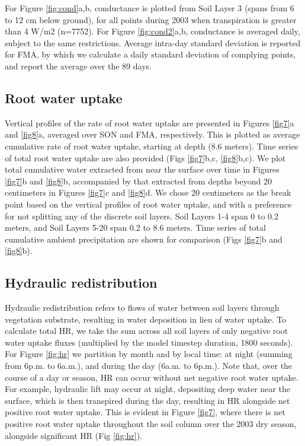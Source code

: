 \documentclass[draft,linenumbers]{agujournal}
\begin{document}
    For Figure \ref{fig:cond}a,b, conductance is plotted from Soil Layer 3 (spans from 6 to 12 cm below ground),
     for all points during 2003 when transpiration is greater than 4 W/m2 (n=7752).
    For Figure \ref{fig:cond2}a,b, conductance is averaged daily, subject to the same restrictions.
    Average intra-day standard deviation is reported for FMA, by which we calculate a daily standard deviation of complying points, and report the average over the 89 days.


\subsection{Root water uptake}
    Vertical profiles of the rate of root water uptake are presented in Figures \ref{fig7}a and \ref{fig8}a, averaged over SON and FMA, respectively.
    This is plotted as average cumulative rate of root water uptake, starting at depth (8.6 meters).
    Time series of total root water uptake are also provided (Figs \ref{fig7}b,c, \ref{fig8}b,c).
    We plot total cumulative water extracted from near the surface over time in Figures \ref{fig7}b and \ref{fig8}b, 
    accompanied by that extracted from depths beyond 20 centimeters in Figures \ref{fig7}c and \ref{fig8}d.
    We chose 20 centimeters as the break point based on the vertical profiles of root water uptake, and with a preference for not splitting any of the discrete soil layers.
    Soil Layers 1-4 span 0 to 0.2 meters, and Soil Layers 5-20 span 0.2 to 8.6 meters.
    Time series of total cumulative ambient precipitation are shown for comparison (Figs \ref{fig7}b and \ref{fig8}b).
    
        
\subsection{Hydraulic redistribution}
    Hydraulic redistribution refers to flows of water between soil layers through vegetation substrate, resulting in water deposition in lieu of water uptake.
    To calculate total HR, we take the sum across all soil layers of only negative root water uptake fluxes (multiplied by the model timestep duration, 1800 seconds).
    For Figure \ref{fig:hr} we partition by month and by local time: at night (summing from 6p.m. to 6a.m.), and during the day (6a.m. to 6p.m.).
    Note that, over the course of a day or season, HR can occur without net negative root water uptake.
    For example, hydraulic lift may occur at night, depositing deep water near the surface, which is then transpired during the day,
    resulting in HR alongside net positive root water uptake.
    This is evident in Figure \ref{fig7}, where there is net positive root water uptake throughout the soil column over the 2003 dry season, alongside significant HR (Fig \ref{fig:hr}).
\end{document}
